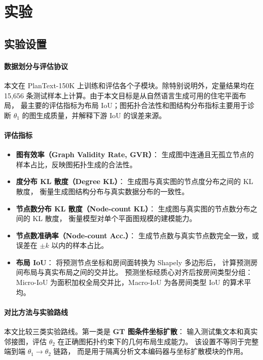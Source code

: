 \section{实验}
\label{sec:experiments}

\subsection{实验设置}
\label{subsec:setup}

\paragraph{数据划分与评估协议}
本文在 PlanText-150K 上训练和评估各个子模块。除特别说明外，定量结果均在
15,656 条测试样本上计算。由于本文目标是从自然语言生成可用的住宅平面布局，
最主要的评估指标为布局 IoU；图拓扑合法性和图结构分布指标主要用于诊断
$\theta_1$ 的图生成质量，并解释下游 IoU 的误差来源。

\paragraph{评估指标}
\begin{itemize}
    \item \textbf{图有效率（Graph Validity Rate, GVR）}：
    生成图中连通且无孤立节点的样本占比，反映图拓扑生成的合法性。

    \item \textbf{度分布 KL 散度（Degree KL）}：
    生成图与真实图的节点度分布之间的 KL 散度，
    衡量生成图结构分布与真实数据分布的一致性。

    \item \textbf{节点数分布 KL 散度（Node-count KL）}：
    生成图与真实图的节点数分布之间的 KL 散度，
    衡量模型对单个平面图规模的建模能力。

    \item \textbf{节点数准确率（Node-count Acc.）}：
    生成节点数与真实节点数完全一致，或误差在 $\pm k$ 以内的样本占比。

    \item \textbf{布局 IoU}：
    将预测节点坐标和房间面转换为 Shapely 多边形后，
    计算预测房间布局与真实布局之间的交并比。
    预测坐标经质心对齐后按房间类型分组：
    Micro-IoU 为面积加权全局交并比，Macro-IoU 为各房间类型 IoU 的算术平均。
\end{itemize}

\paragraph{对比方法与实验路线}
本文比较三类实验路线。第一类是 \textbf{GT 图条件坐标扩散}：
输入测试集文本和真实邻接图，评估 $\theta_2$ 在正确图拓扑约束下的几何布局生成能力。
该设置不等同于完整端到端 $\theta_1\to\theta_2$ 链路，
而是用于隔离分析文本编码器与坐标扩散模块的作用。

